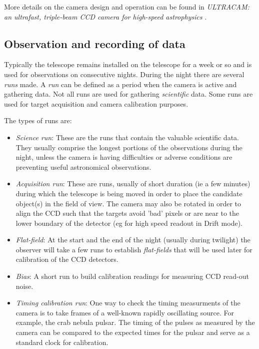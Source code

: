 \documentclass[a4paper,10pt]{article}
\begin{document}
More details on the camera design and operation can be found in \emph{ULTRACAM: an ultrafast, triple-beam CCD camera for high-speed
astrophysics \cite{dhillon07}}.

\subsection{Observation and recording of data}

Typically the telescope remains installed on the telescope for a week or so and is used for observations on consecutive nights. During the night there are several \emph{runs} made. A \emph{run} can be defined as a period when the camera is active and gathering data. Not all runs are used for gathering \emph{scientific} data. Some runs are used for target acquisition and camera calibration purposes. 

The types of runs are: 
\begin{itemize}
	\item \emph{Science run}: These are the runs that contain the valuable scientific data. They usually comprise the longest portions of the observations during the night, unless the camera is having difficulties or adverse conditions are preventing useful astronomical observations.
	\item \emph{Acquisition run}: These are runs, usually of short duration (ie a few minutes) during which the telescope is being moved in order to place the candidate object(s) in the field of view. The camera may also be rotated in order to align the CCD such that the targets avoid 'bad' pixels or are near to the lower boundary of the detector (eg for high speed readout in Drift mode). 
	\item \emph{Flat-field}: At the start and the end of the night (usually during twilight) the observer will take a few runs to establish \emph{flat-fields} that will be used later for calibration of the CCD detectors.  
	\item \emph{Bias}: A short run to build calibration readings for measuring CCD read-out noise. 
	\item \emph{Timing calibration run}: One way to check the timing measurments of the camera is to take frames of a well-known rapidly oscillating source. For example, the crab nebula pulsar. The timing of the pulses as measured by the camera can be compared to the expected times for the pulsar and serve as a standard clock for calibration.
\end{itemize}
\end{document}
